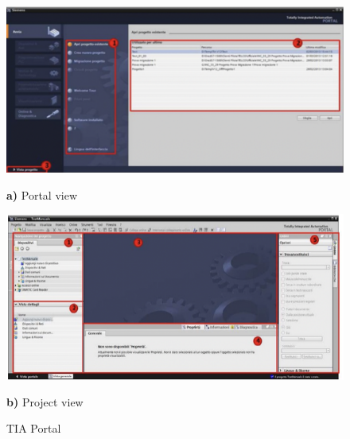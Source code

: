 \documentclass[a4paper,11pt]{report}
\theoremstyle{definition}
\theoremstyle{plain}
\begin{document}
            \begin{figure}[H]
                \centering
            
                \begin{minipage}{0.45\textwidth}
                    \centering
                    \includegraphics[scale=0.5]{images/portalview.png}
                    \caption*{\textbf{a)} Portal view}
                \end{minipage}
                \hfill
                \begin{minipage}{0.45\textwidth}
                    \centering
                    \includegraphics[scale=0.5]{images/projectview.png}
                    \caption*{\textbf{b)} Project view}
                \end{minipage}
            
                \caption{TIA Portal}
            \end{figure}
            
\end{document}
